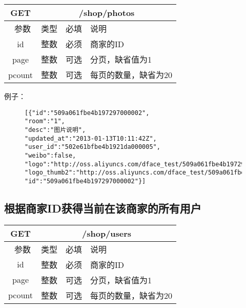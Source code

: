 \documentclass[cs4size]{ctexartutf8}
\begin{document}
\begin{table}[H]
   \begin{center}
\begin{tabular}{|c|c|c|p{12cm}|}
\hline
GET & \multicolumn{3}{|c|}{/shop/photos} \\
\hline\hline
 \  参数  & 类型 & 必填 &  说明  \\
\hline
 id  & 整数 & 必须 & 商家的ID\\
   \hline
 page  & 整数 & 可选 & 分页，缺省值为1\\ 
 \hline
 pcount  & 整数 & 可选 & 每页的数量，缺省为20\\ 
\hline
\end{tabular}
   \end{center}
\end{table}

例子：

\begin{figure}[H]
\begin{verbatim}
[{"id":"509a061fbe4b197297000002",
"room":"1",
"desc":"图片说明",  
"updated_at":"2013-01-13T10:11:42Z",
"user_id":"502e61bfbe4b1921da000005",
"weibo":false,
"logo":"http://oss.aliyuncs.com/dface_test/509a061fbe4b197297000002/0.jpg",
"logo_thumb2":"http://oss.aliyuncs.com/dface_test/509a061fbe4b197297000002/t2_0.jpg",
"id":"509a061fbe4b197297000002"}]

\end{verbatim}
\end{figure}


\subsection{根据商家ID获得当前在该商家的所有用户}

\begin{table}[H]
   \begin{center}
\begin{tabular}{|c|c|c|p{12cm}|}
\hline
GET & \multicolumn{3}{|c|}{/shop/users} \\
\hline\hline
 \  参数  & 类型 & 必填 &  说明  \\
\hline
 id  & 整数 & 必须 & 商家的ID\\
  \hline
 page  & 整数 & 可选 & 分页，缺省值为1\\ 
 \hline
 pcount  & 整数 & 可选 & 每页的数量，缺省为20\\ 
\hline
\end{tabular}
   \end{center}
\end{table}
\end{document}
